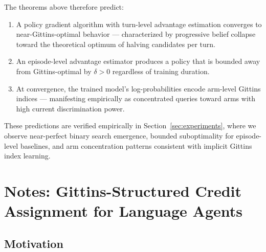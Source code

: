 \documentclass[11pt]{article}
\theoremstyle{plain}
\theoremstyle{definition}
\theoremstyle{remark}
\begin{document}
The theorems above therefore predict:
\begin{enumerate}
    \item A policy gradient algorithm with turn-level advantage 
          estimation converges to near-Gittins-optimal behavior 
          — characterized by progressive belief collapse toward 
          the theoretical optimum of halving candidates per turn.
    \item An episode-level advantage estimator produces a policy 
          that is bounded away from Gittins-optimal by 
          $\delta > 0$ regardless of training duration.
    \item At convergence, the trained model's log-probabilities 
          encode arm-level Gittins indices — manifesting 
          empirically as concentrated queries toward arms with 
          high current discrimination power.
\end{enumerate}
These predictions are verified empirically in 
Section~\ref{sec:experiments}, where we observe near-perfect 
binary search emergence, bounded suboptimality for episode-level 
baselines, and arm concentration patterns consistent with 
implicit Gittins index learning.



\section{Notes: Gittins-Structured Credit Assignment for Language Agents}

\subsection{Motivation}
\end{document}
